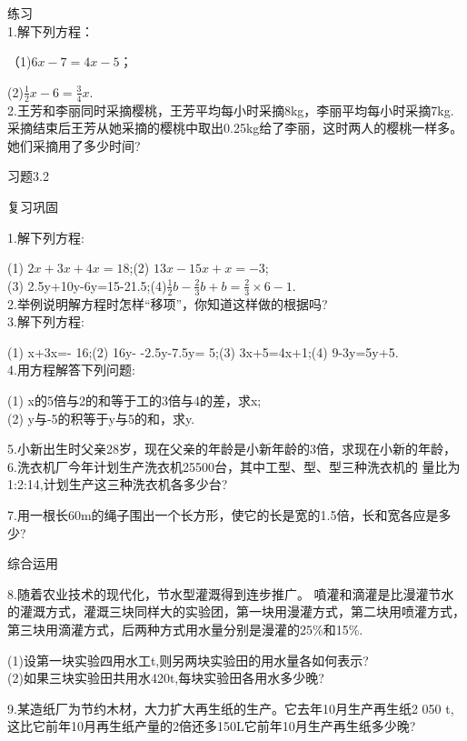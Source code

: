 \documentclass{article}
\begin{document}
\begin{article}

\begin{exercise}

练习\\1.解下列方程：

\indent（1)$6x-7=4x-5$；

\indent (2)$\frac{1}{2}x-6=\frac{3}{4}x$.\\2.王芳和李丽同时采摘樱桃，王芳平均每小时采摘8kg，李丽平均每小时采摘7kg.采摘结束后王芳从她采摘的樱桃中取出0.25kg给了李丽，这时两人的樱桃一样多。她们采摘用了多少时间?
\end{exercise}

\begin{exercise}

习题3.2

复习巩固

1.解下列方程:

      (1) $2x+3x+4x=18$;\indent (2) $13x-15x+x=-3$;
\\
      (3) 2.5y+10y-6y=15-21.5;\indent (4)$\frac{1}{2}b-\frac{2}{3}b+b=\frac{2}{3}\times6-1$.\\2.举例说明解方程时怎样“移项”，你知道这样做的根据吗?\\3.解下列方程:

      (1) x+3x=- 16;\indent (2) 16y- -2.5y-7.5y= 5;\indent(3) 3x+5=4x+1;\indent(4) 9-3y=5y+5.\\4.用方程解答下列问题:

      (1) x的5倍与2的和等于工的3倍与4的差，求x;\\(2) y与-5的积等于y与5的和，求y.

5.小新出生时父亲28岁，现在父亲的年龄是小新年龄的3倍，求现在小新的年龄，6.洗衣机厂今年计划生产洗衣机25500台，其中工型、型、型三种洗衣机的  量比为1:2:14,计划生产这三种洗衣机各多少台?

7.用一根长60m的绳子围出一个长方形，使它的长是宽的1.5倍，长和宽各应是多少?

综合运用

8.随着农业技术的现代化，节水型灌溉得到连步推广。
噴灌和滴灌是比漫灌节水的灌溉方式，灌溉三块同样大的实验团，第一块用漫灌方式，第二块用喷灌方式，第三块用滴灌方式，后两种方式用水量分别是漫灌的25\%和15\%.

(1)设第一块实验四用水工t,则另两块实验田的用水量各如何表示?\\(2)如果三块实验田共用水420t,每块实验田各用水多少晚?

9.某造纸厂为节约木材，大力扩大再生纸的生产。它去年10月生产再生纸2 050 t,这比它前年10月再生纸产量的2倍还多150L它前年10月生产再生纸多少晚?


\end{exercise}
\end{article}
\end{document}
